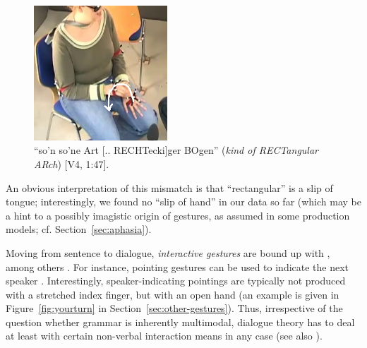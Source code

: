 \documentclass[output=paper]{langsci/langscibook}
\begin{document}
\begin{figure}
  \centering
  \includegraphics[trim={2cm 0 0 3cm}, clip, width=5cm]{figures/rechteckiger-Bogen}
  \caption[Rectangular arch]{\enquote{so'n so'ne Art [.. RECHTecki]ger BOgen} (\textit{kind of RECTangular ARch}) [V4, 1:47].}
  \label{fig:contradiction}
\end{figure}

An obvious interpretation of this mismatch is that \enquote{rectangular} is a slip of tongue; interestingly, we found no \enquote{slip of hand} in our data so far (which may be a hint to a possibly imagistic origin of gestures, as assumed in some production models; cf. Section~\ref{sec:aphasia}).


Moving from sentence to dialogue, \emph{interactive gestures}  are bound up with , among others \citep{Bavelas:Chovil:Lawrie:Wade:1992,Bavelas:Chovil:Coates:Roe:1995}.
%
For instance, pointing gestures can be used to indicate the next speaker \citep{Rieser:Poesio:2009}. 
%
Interestingly, speaker-indicating pointings are typically not produced with a stretched index finger, but with an open hand (an example is given in Figure~\ref{fig:yourturn} in Section~\ref{sec:other-gestures}).
%
Thus, irrespective of the question whether grammar is inherently multimodal, dialogue theory has to deal at least with certain non-verbal interaction means in any case (see also ).
\end{document}
